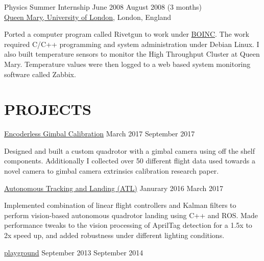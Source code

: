 \documentclass[line,margin]{cv}
\begin{document}
\begin{resume}
Physics Summer Internship
\hfill June 2008 \textemdash{} August 2008 (3 months) \\
\href{http://www.qmul.ac.uk}{Queen Mary, University of London}, London, England

\vspace{0.1em}
\begin{adjustwidth}{2.0em}{2.0em}
    Ported a computer program called Rivetgun to work under
    \href{https://boinc.berkeley.edu/} {BOINC}\@. The work required C/C++
    programming and system administration under Debian Linux. I also built 
    temperature sensors to monitor the High Throughput Cluster at Queen Mary.
    Temperature values were then logged to a web based system monitoring 
    software called Zabbix.
\end{adjustwidth}



\section{PROJECTS}

\href{https://youtu.be/v0OLmIKHQlM}
{Encoderless Gimbal Calibration}
\hfill March 2017 \textemdash{} September 2017

\vspace{0.1em}
\begin{adjustwidth}{2.0em}{2.0em}
	Designed and built a custom quadrotor with a gimbal camera using off the shelf 
	components.	Additionally I collected over 50 different flight data used towards a novel camera to gimbal camera extrinsics calibration research paper.
\end{adjustwidth}


\href{https://www.youtube.com/watch?v=5EP2ndrXJN}
{Autonomous Tracking and Landing (ATL)}
\hfill Janurary 2016 \textemdash{} March 2017

\vspace{0.1em}
\begin{adjustwidth}{2.0em}{2.0em}
	Implemented combination of linear flight controllers and Kalman filters to perform
	vision-based autonomous quadrotor landing using C++ and ROS. Made performance 
	tweaks to the vision processing of AprilTag detection for a 1.5x to 2x speed up, 
	and added robustness under different lighting conditions.
\end{adjustwidth}


\href{http://chutsu.github.io/playground}{playground}
\hfill September 2013 \textemdash{} September 2014


\end{resume}
\end{document}
